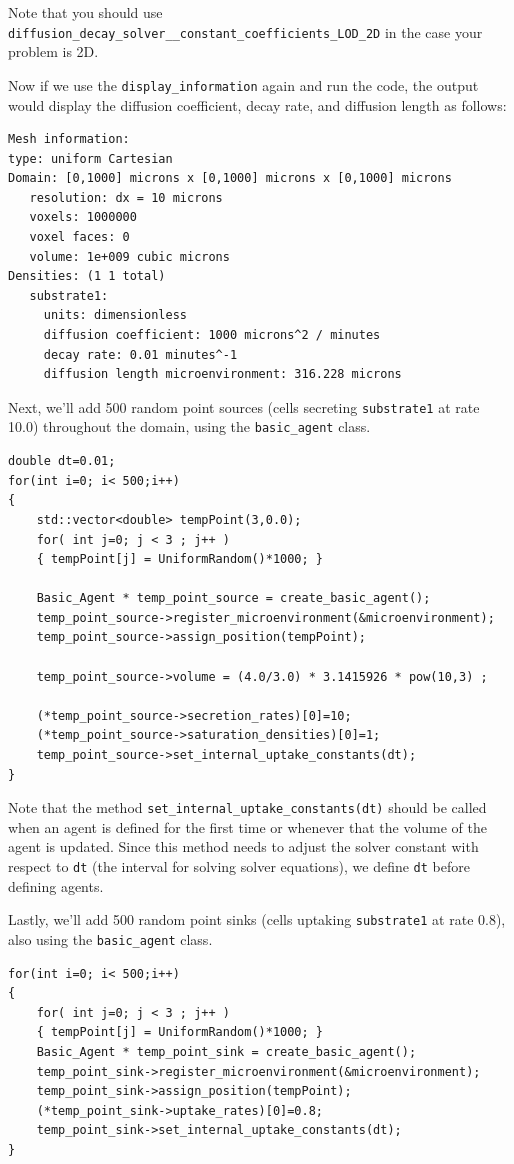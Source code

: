 \documentclass[11pt]{article}
\begin{document}
Note that you should use \verb:diffusion_decay_solver__constant_coefficients_LOD_2D: in the case your problem is 2D.

Now if we use the \verb:display_information: again and run the code, the output would display the
diffusion coefficient, decay rate, and diffusion length as follows:

\begin{verbatim}
Mesh information:
type: uniform Cartesian
Domain: [0,1000] microns x [0,1000] microns x [0,1000] microns
   resolution: dx = 10 microns
   voxels: 1000000
   voxel faces: 0
   volume: 1e+009 cubic microns
Densities: (1 1 total)
   substrate1:
     units: dimensionless
     diffusion coefficient: 1000 microns^2 / minutes
     decay rate: 0.01 minutes^-1
     diffusion length microenvironment: 316.228 microns
\end{verbatim}



Next, we'll add 500 random point sources (cells secreting \verb:substrate1: at rate 10.0)
throughout the domain, using the \verb:basic_agent: class.
\begin{verbatim}
double dt=0.01;
for(int i=0; i< 500;i++)
{
    std::vector<double> tempPoint(3,0.0);
    for( int j=0; j < 3 ; j++ )
    { tempPoint[j] = UniformRandom()*1000; }		
    	
    Basic_Agent * temp_point_source = create_basic_agent();
    temp_point_source->register_microenvironment(&microenvironment);
    temp_point_source->assign_position(tempPoint);
    
    temp_point_source->volume = (4.0/3.0) * 3.1415926 * pow(10,3) ; 

    (*temp_point_source->secretion_rates)[0]=10;
    (*temp_point_source->saturation_densities)[0]=1;
    temp_point_source->set_internal_uptake_constants(dt);
}
\end{verbatim}

Note that the method \verb:set_internal_uptake_constants(dt): should be called when an agent is defined for the first time
or whenever that the volume of the agent is updated. Since this method needs to adjust the solver constant with respect to \verb:dt:
(the interval for solving solver equations), we define \verb:dt: before defining agents.

Lastly, we'll add 500 random point sinks (cells uptaking \verb:substrate1: at rate 0.8), also
using the  \verb:basic_agent: class.

\begin{verbatim}
for(int i=0; i< 500;i++)
{
    for( int j=0; j < 3 ; j++ )
    { tempPoint[j] = UniformRandom()*1000; }		
    Basic_Agent * temp_point_sink = create_basic_agent();
    temp_point_sink->register_microenvironment(&microenvironment);
    temp_point_sink->assign_position(tempPoint);
    (*temp_point_sink->uptake_rates)[0]=0.8;
    temp_point_sink->set_internal_uptake_constants(dt);
}
\end{verbatim}
\end{document}
